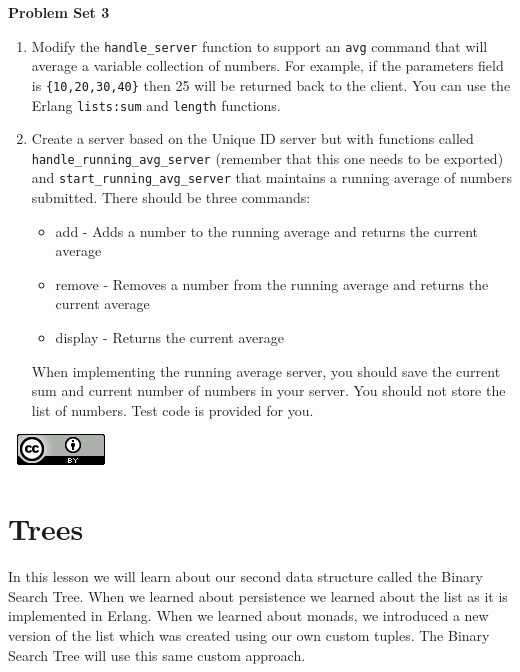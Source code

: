 \documentclass[
]{book}
\providecommand{\tightlist}{%
  \setlength{\itemsep}{0pt}\setlength{\parskip}{0pt}}
\begin{document}
\begin{problembox}

\textbf{Problem Set 3}

\begin{enumerate}
\def\labelenumi{\arabic{enumi}.}
\tightlist
\item
  Modify the \texttt{handle\_server} function to support an \texttt{avg} command that will average a variable collection of numbers. For example, if the parameters field is \texttt{\{10,20,30,40\}} then 25 will be returned back to the client. You can use the Erlang \texttt{lists:sum} and \texttt{length} functions.
\item
  Create a server based on the Unique ID server but with functions called \texttt{handle\_running\_avg\_server} (remember that this one needs to be exported) and \texttt{start\_running\_avg\_server} that maintains a running average of numbers submitted. There should be three commands:

  \begin{itemize}
  \tightlist
  \item
    add - Adds a number to the running average and returns the current average
  \item
    remove - Removes a number from the running average and returns the current average
  \item
    display - Returns the current average
  \end{itemize}

  When implementing the running average server, you should save the current sum and current number of numbers in your server. You should not store the list of numbers. Test code is provided for you.
\end{enumerate}

\end{problembox}

\(\nonumber\)
\(\nonumber\)
\href{http://creativecommons.org/licenses/by/4.0/}{\includegraphics{images/cc-88x31.png}}

\hypertarget{trees}{%
\chapter{Trees}\label{trees}}

In this lesson we will learn about our second data structure called the Binary Search Tree. When we learned about persistence we learned about the list as it is implemented in Erlang. When we learned about monads, we introduced a new version of the list which was created using our own custom tuples. The Binary Search Tree will use this same custom approach.
\end{document}
